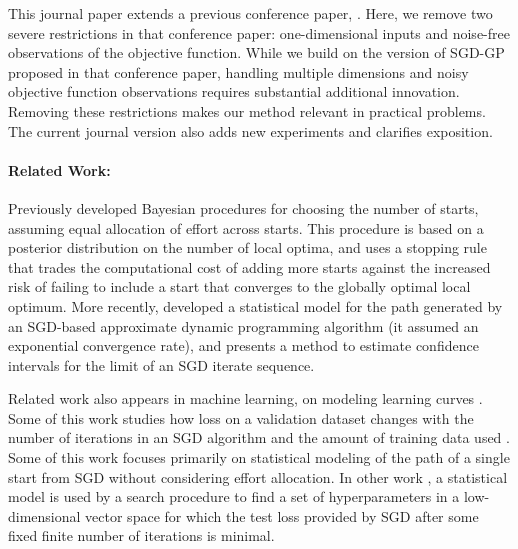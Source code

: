 \documentclass[12pt,english]{article}
\newcommand{\stedit}[1]{{\color{blue} #1}}
\begin{document}
This journal paper extends a previous conference paper, \cite{multi_start}. Here, we remove two severe restrictions in that conference paper: one-dimensional inputs and noise-free observations of the objective function.  While we build on the version of SGD-GP proposed in that conference paper, handling multiple dimensions and noisy objective function observations requires substantial additional innovation.  Removing these restrictions makes our method relevant in practical problems.
The current journal version also adds new experiments and clarifies exposition.


\paragraph{Related Work:}
Previously \cite{boender:1987} developed Bayesian procedures for choosing the number of starts, assuming equal allocation of effort across starts.
This procedure is based on a posterior distribution on the number of local optima, and uses a stopping rule that trades the computational cost of adding more starts against the increased risk of failing to include a start that converges to the globally optimal local optimum. More recently, \cite{frazier2009calibration} developed a statistical model for the path generated by an SGD-based approximate dynamic programming algorithm \stedit{(it assumed an exponential convergence rate)}, and \cite{chen2016} presents a method to estimate confidence intervals for the limit of an SGD iterate sequence.


Related work also appears in machine learning, on modeling learning curves \citep{Swersky:2014,Hutter:2015,klein2016fast,boca2017,li2016}. Some of this work studies how loss on a validation dataset changes with the number of iterations in an SGD algorithm  \citep{Swersky:2014,Hutter:2015} and the amount of training data used  \citep{klein2016fast}. 
Some of this work   \citep{Hutter:2015} focuses primarily on statistical modeling of the path of a single start from SGD without considering effort allocation.  In other work  \citep{Swersky:2014,klein2016fast}, a statistical model is used by a search procedure to find a set of hyperparameters in a low-dimensional vector space for which the test loss provided by SGD after some fixed finite number of iterations is minimal.  
\end{document}
